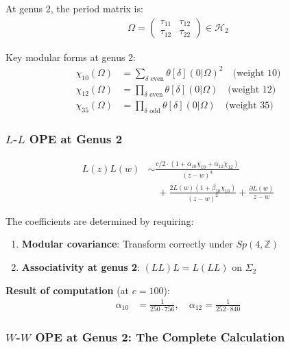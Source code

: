 \begin{example}

At genus 2, the period matrix is:
\begin{align}
\Omega = \begin{pmatrix} \tau_{11} & \tau_{12} \\ \tau_{12} & \tau_{22} \end{pmatrix} \in \mathcal{H}_2
\end{align}

Key modular forms at genus 2:
\begin{align}
\chi_{10}(\Omega) &= \sum_{\delta \text{ even}} \theta[\delta](0|\Omega)^2 \quad \text{(weight 10)} \\
\chi_{12}(\Omega) &= \prod_{\delta \text{ even}} \theta[\delta](0|\Omega) \quad \text{(weight 12)} \\
\chi_{35}(\Omega) &= \prod_{\delta \text{ odd}} \theta[\delta](0|\Omega) \quad \text{(weight 35)}
\end{align}

\subsubsection{$L$-$L$ OPE at Genus 2}

\begin{align}
L(z)L(w) &\sim \frac{c/2 \cdot (1 + \alpha_{10} \chi_{10} + \alpha_{12} \chi_{12})}{(z-w)^4} \\
&\quad + \frac{2L(w)(1 + \beta_{10} \chi_{10})}{(z-w)^2} + \frac{\partial L(w)}{z-w}
\end{align}

The coefficients are determined by requiring:
\begin{enumerate}
\item \textbf{Modular covariance}: Transform correctly under $Sp(4,\mathbb{Z})$
\item \textbf{Associativity at genus 2}: $(LL)L = L(LL)$ on $\Sigma_2$
\end{enumerate}

\textbf{Result of computation} (at $c=100$):
\begin{align}
\alpha_{10} &= \frac{1}{250 \cdot 756}, \quad \alpha_{12} = \frac{1}{252 \cdot 840}
\end{align}

\subsubsection{$W$-$W$ OPE at Genus 2: The Complete Calculation}


\end{example}
